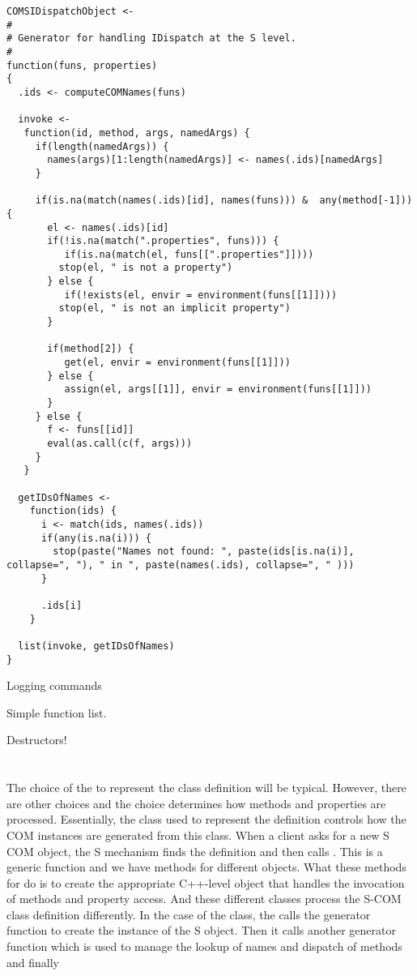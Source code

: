\documentclass[11pt]{article}
\begin{document}
\begin{verbatim}
COMSIDispatchObject <-
#
# Generator for handling IDispatch at the S level.
# 
function(funs, properties)
{
  .ids <- computeCOMNames(funs)

  invoke <-
   function(id, method, args, namedArgs) {
     if(length(namedArgs)) {
       names(args)[1:length(namedArgs)] <- names(.ids)[namedArgs]
     }

     if(is.na(match(names(.ids)[id], names(funs))) &  any(method[-1])) {
       el <- names(.ids)[id]
       if(!is.na(match(".properties", funs))) {
          if(is.na(match(el, funs[[".properties"]]))) 
	     stop(el, " is not a property")
       } else {
          if(!exists(el, envir = environment(funs[[1]])))
	     stop(el, " is not an implicit property")
       }
         
       if(method[2]) {
          get(el, envir = environment(funs[[1]]))
       } else {
          assign(el, args[[1]], envir = environment(funs[[1]]))
       }
     } else {
       f <- funs[[id]]
       eval(as.call(c(f, args)))
     }
   }

  getIDsOfNames <- 
    function(ids) {
      i <- match(ids, names(.ids))       
      if(any(is.na(i))) {
        stop(paste("Names not found: ", paste(ids[is.na(i)], collapse=", "), " in ", paste(names(.ids), collapse=", " )))
      }

      .ids[i]
    }

  list(invoke, getIDsOfNames)	
}
\end{verbatim}

Logging commands

Simple function list.


Destructors!








\section{}
The choice of the  to represent the class
definition will be typical. However, there are other choices and the
choice determines how methods and properties are processed.
Essentially, the class used to represent the definition controls how
the COM instances are generated from this class.  When a client asks
for a new S COM object, the S mechanism finds the definition and then
calls .  This is a generic function and we
have methods for different  objects.  What these
methods for  do is to create the
appropriate C++-level object that handles the invocation of methods
and property access.  And these different classes process the S-COM
class definition differently.  In the case of the
 class, the  calls
the generator function to create the instance of the S object.  Then
it calls another generator function which is used to manage the lookup
of names and dispatch of methods and finally 
\end{document}
